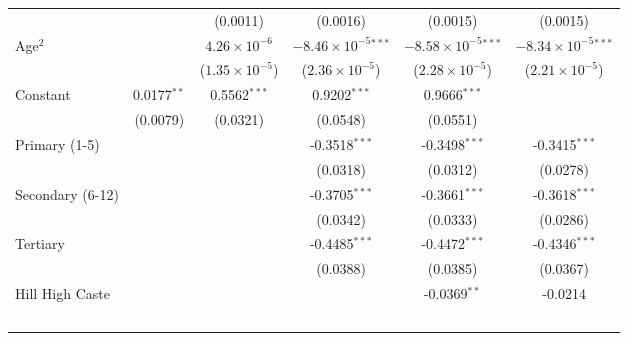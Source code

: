 \begin{tabular}{lccccc}
                                  &                                & (0.0011)                       & (0.0016)                       & (0.0015)                       & (0.0015)\\   
   Age$^2$                        &                                & $4.26\times 10^{-6}$           & $-8.46\times 10^{-5}$$^{***}$  & $-8.58\times 10^{-5}$$^{***}$  & $-8.34\times 10^{-5}$$^{***}$\\    
                                  &                                & ($1.35\times 10^{-5}$)         & ($2.36\times 10^{-5}$)         & ($2.28\times 10^{-5}$)         & ($2.21\times 10^{-5}$)\\    
   Constant                       & 0.0177$^{**}$                  & 0.5562$^{***}$                 & 0.9202$^{***}$                 & 0.9666$^{***}$                 &   \\   
                                  & (0.0079)                       & (0.0321)                       & (0.0548)                       & (0.0551)                       &   \\   
   Primary (1-5)                  &                                &                                & -0.3518$^{***}$                & -0.3498$^{***}$                & -0.3415$^{***}$\\   
                                  &                                &                                & (0.0318)                       & (0.0312)                       & (0.0278)\\   
   Secondary (6-12)               &                                &                                & -0.3705$^{***}$                & -0.3661$^{***}$                & -0.3618$^{***}$\\   
                                  &                                &                                & (0.0342)                       & (0.0333)                       & (0.0286)\\   
   Tertiary                       &                                &                                & -0.4485$^{***}$                & -0.4472$^{***}$                & -0.4346$^{***}$\\   
                                  &                                &                                & (0.0388)                       & (0.0385)                       & (0.0367)\\   
   Hill High Caste                &                                &                                &                                & -0.0369$^{**}$                 & -0.0214\\   
$$
\end{tabular}
